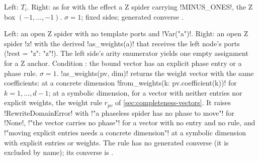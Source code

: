Left: $T_i$. Right: as for  with the effect a Z spider carrying
\py!MINUS_ONES!, the Z box $(-1,\dots,-1)$. $\sigma=1$; fixed sides; generated converse
.

Left: an open Z spider with no template ports and \py!Var("a")!. Right: an open Z spider \code!z!
with the derived \py!as_weights(a)! that receives the left node's ports
(\py!rest = {"z": "z"}!). The left side's arity enumerator yields one empty assignment for a Z
anchor. Condition : the bound vector has an explicit phase entry or a phase
rule. $\sigma=1$. \py!as_weights(pv, dim)! returns the weight vector with the same coefficients:
at a concrete dimension \py!from_weights({k: pv.coefficient(k)})! for $k=1,\dots,d-1$; at a
symbolic dimension, for a vector with neither entries nor explicit weights, the weight rule
$r_{pv}$ of \cref{sec:completeness-vectors}. It raises \py!RewriteDomainError! with
\code!"a phaseless spider has no phase to move"! for \py!None!,
\code!"the vector carries no phase"! for a vector with no entry and no rule, and
\code!"moving explicit entries needs a concrete dimension"! at a symbolic dimension with explicit
entries or weights. The rule has no generated converse (it is excluded by name); its converse is
.

